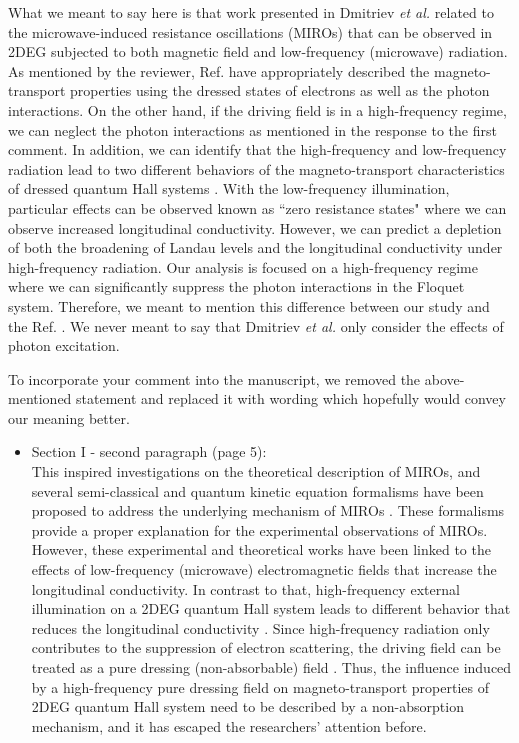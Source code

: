 \documentclass{article}
\begin{document}
What we meant to say here is that work presented in Dmitriev \textit{et al.} \cite{dmitriev09} related to the microwave-induced resistance oscillations (MIROs) that can be observed in 2DEG subjected to both magnetic field and low-frequency (microwave) radiation. As mentioned by the reviewer, Ref. \cite{dmitriev09} have appropriately described the magneto-transport properties using the dressed states of electrons as well as the photon interactions. On the other hand, if the driving field is in a high-frequency regime, we can neglect the photon interactions as mentioned in the response to the first comment. In addition, we can identify that the high-frequency and low-frequency radiation lead to two different behaviors of the magneto-transport characteristics of dressed quantum Hall systems \cite{dini16}. With the low-frequency illumination, particular effects can be observed known as ``zero resistance states" where we can observe increased longitudinal conductivity. However, we can predict a depletion of both the broadening of Landau levels and the longitudinal conductivity under high-frequency radiation.
Our analysis is focused on a high-frequency regime where we can significantly suppress the photon interactions in the Floquet system. Therefore, we meant to mention this difference between our study and the Ref. \cite{dmitriev09}. We never meant to say that Dmitriev \textit{et al.} \cite{dmitriev09} only consider the effects of photon excitation.

To incorporate your comment into the manuscript, we removed the above-mentioned statement and replaced it with wording which hopefully would convey our meaning better.

\begin{itemize}
  \item Section I - second paragraph (page 5):\\
  {\color{Red}
  This inspired investigations on the theoretical description of MIROs, and several semi-classical and quantum kinetic equation formalisms have been proposed to address the underlying mechanism of MIROs \cite{durst03,dmitriev03,dmitriev05,dmitriev09}. These formalisms provide a proper explanation for the experimental observations of MIROs. However, these experimental and theoretical works have been linked to the effects of low-frequency (microwave) electromagnetic fields that increase the longitudinal conductivity.
  In contrast to that, high-frequency external illumination on a 2DEG quantum Hall system leads to different behavior that reduces the longitudinal conductivity \cite{dini16}.
  Since high-frequency radiation only contributes to the suppression of electron scattering, the driving field can be treated as a pure dressing (non-absorbable) field \cite{dini16}.
  Thus, the influence induced by a high-frequency pure dressing field on
  magneto-transport properties of 2DEG quantum Hall system need to be described by a non-absorption mechanism, and it has escaped the researchers’ attention before.
  }
\end{itemize}
\end{document}
